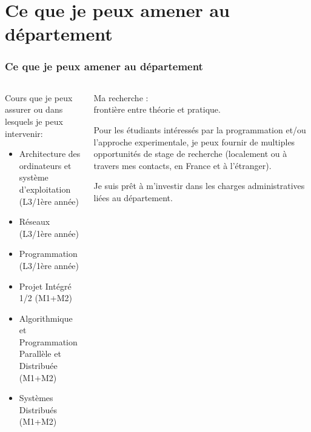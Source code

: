 \documentclass[compress,aspectratio=169]{beamer}
\begin{document}
\section{Ce que je peux amener au d\'epartement}

\begin{frame}
  \frametitle{Ce que je peux amener au d\'epartement}

  \begin{columns}
    \begin{column}{.45\linewidth}
      \small
      Cours que je peux assurer ou dans lesquels je peux intervenir:
      \begin{itemize}
      \item Architecture des ordinateurs et syst\`eme d'exploitation (L3/1\`ere ann\'ee)
      \item R\'eseaux (L3/1\`ere ann\'ee)
      \item Programmation (L3/1\`ere ann\'ee)
      \item Projet Int\'egr\'e 1/2 (M1+M2)
      \item Algorithmique et Programmation Parall\`ele et Distribu\'ee (M1+M2)
      \item Syst\`emes Distribu\'es (M1+M2)
      \end{itemize}
    \end{column}\begin{column}{.45\linewidth}
      \small
      Ma recherche : \\
      fronti\`ere entre th\'eorie et pratique.

      \bigskip
      
      Pour les \'etudiants int\'eress\'es par la programmation et/ou l'approche experimentale, je peux fournir de multiples opportunit\'es de stage de recherche (localement ou \`a travers mes contacts, en France et \`a l'\'etranger).

      \bigskip

      Je suis pr\^et \`a m'investir dans les charges administratives li\'ees au d\'epartement.
      
    \end{column}
  \end{columns}
  
\end{frame}
\end{document}

